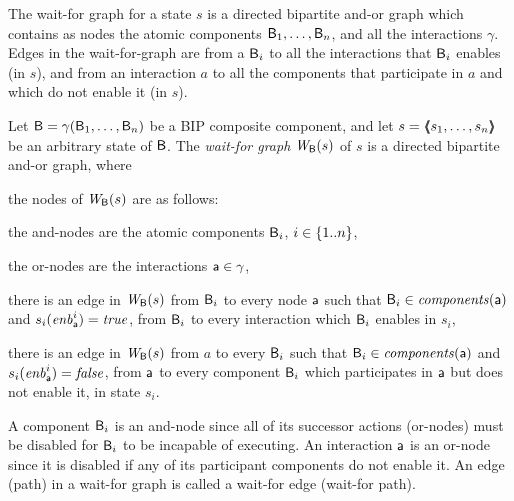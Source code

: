 The wait-for graph for a state $s$ is a directed bipartite and-or
graph which contains as nodes the atomic components $\mathsf{B}_1, \ldots,
\mathsf{B}_n$, and all the interactions $\gamma$.  Edges in the wait-for-graph
are from a $\mathsf{B}_i$ to all the interactions that $\mathsf{B}_i$ enables (in $s$),
and from an interaction $a$ to all the components that participate in
$a$ and which do not enable it (in $s$).


\begin{definition}
\label{def:static:wait-for-graph} 
\label{defn:static:wait-for-graph} 
Let $\mathsf{B} = \gamma(\mathsf{B}_1,\dots,\mathsf{B}_n)$ be a BIP composite component, and let
$s = \langle \hspace{-0.34em} \langle \hspace{-0.34em} \langle s_1,\ldots,s_n \rangle \hspace{-0.34em} \rangle \hspace{-0.34em} \rangle$ be an arbitrary state of $\mathsf{B}$.
The {\em wait-for graph} $\mathit{W}_{\mathsf{B}}({s})$ of $s$ is a directed bipartite and-or graph, where
\begin{nlst1}

\item \label{def:static:wait-for-graph:nodes} the nodes of $\mathit{W}_{\mathsf{B}}({s})$ are as follows:
%
   \begin{nlst2}
   \item the and-nodes are the atomic components $\mathsf{B}_i$, $i \in \{ 1..n \}$,
   \item the or-nodes are the interactions $\mathsf{a} \in \gamma$,
   \end{nlst2}

\item \label{def:static:wait-for-graph:edges-aut-action} 
   there is an edge in $\mathit{W}_{\mathsf{B}}({s})$ from $\mathsf{B}_i$ to every node 
   $\mathsf{a}$ such that $\mathsf{B}_i \in \mathit{components}(\mathsf{a})$ and $s_i(\mathit{enb}_{\mathsf{a}}^{i}) = \mathit{true}$, \ie from $\mathsf{B}_i$ to every interaction
   which $\mathsf{B}_i$ enables in $s_i$,

\item  \label{def:static:wait-for-graph:edges-action-aut}
   there is an edge in $\mathit{W}_{\mathsf{B}}({s})$ from $a$ to every 
   $\mathsf{B}_i$ such that $\mathsf{B}_i \in \mathit{components}(\mathsf{a})$ and $s_i(\mathit{enb}_{\mathsf{a}}^{i}) = \mathit{false}$, \ie from $\mathsf{a}$ to every component
   $\mathsf{B}_i$ which participates in $\mathsf{a}$ but does not enable it, in state $s_i$.
                  
\end{nlst1}
\end{definition}

A component $\mathsf{B}_i$ is an and-node since all of its successor actions (or-nodes) must be disabled for
$\mathsf{B}_i$ to be incapable of executing.  An interaction $\mathsf{a}$ is an or-node since it is disabled if
any of its participant components do not enable it.  An edge (path) in a wait-for graph is called a
wait-for edge (wait-for path). 


